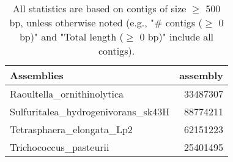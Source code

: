 \documentclass[12pt,a4paper]{article}
\begin{document}
\begin{table}[ht]
\begin{center}
\caption{All statistics are based on contigs of size $\geq$ 500 bp, unless otherwise noted (e.g., "\# contigs ($\geq$ 0 bp)" and "Total length ($\geq$ 0 bp)" include all contigs).}
\begin{tabular}{|l*{1}{|r}|}
\hline
Assemblies & assembly \\ \hline
Raoultella\_ornithinolytica & 33487307 \\ \hline
Sulfuritalea\_hydrogenivorans\_sk43H & 88774211 \\ \hline
Tetrasphaera\_elongata\_Lp2 & 62151223 \\ \hline
Trichococcus\_pasteurii & 25401495 \\ \hline
\end{tabular}
\end{center}
\end{table}
\end{document}
